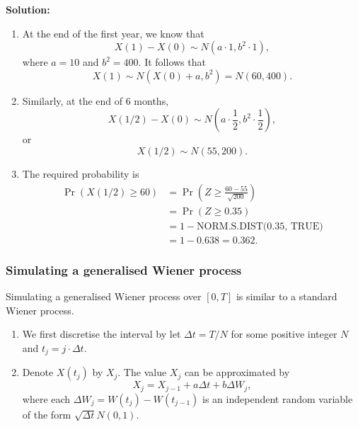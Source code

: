 \documentclass[
]{book}
\theoremstyle{definition}
\theoremstyle{definition}
\theoremstyle{definition}
\theoremstyle{definition}
\theoremstyle{remark}
\begin{document}
\textbf{Solution:}

\begin{enumerate}
\def\labelenumi{\arabic{enumi}.}
\item
  At the end of the first year, we know that
  \[X(1) - X(0) \sim N(a \cdot 1, b^2 \cdot 1),\] where \(a = 10\) and
  \(b^2 = 400\). It follows that
  \[X(1) \sim N(X(0) + a , b^2 ) = N(60, 400).\]
\item
  Similarly, at the end of 6 months,
  \[X(1/2) - X(0) \sim N(a \cdot \frac{1}{2}, b^2 \cdot \frac{1}{2}),\]
  or \[X(1/2) \sim N(55,200).\]
\item
  The required probability is \[\begin{aligned}
          \Pr( X(1/2) \ge 60) &= \Pr( Z \ge \frac{60 - 55}{\sqrt{200}}  )\\
          &= \Pr(Z \ge 0.35) \\
          &= 1 - \text{NORM.S.DIST(0.35, TRUE)} \\
          &= 1 - 0.638 = 0.362.
      \end{aligned}\]
\end{enumerate}

\hypertarget{simulating-a-generalised-wiener-process}{%
\subsubsection{Simulating a generalised Wiener process}\label{simulating-a-generalised-wiener-process}}

Simulating a generalised Wiener process over \([0,T]\) is similar to a
standard Wiener process.

\begin{enumerate}
\def\labelenumi{\arabic{enumi}.}
\item
  We first discretise the interval by let \(\Delta t = T/N\) for some
  positive integer \(N\) and \(t_j = j \cdot \Delta t\).
\item
  Denote \(X(t_j)\) by \(X_j\). The value \(X_j\) can be approximated by
  \[X_j = X_{j-1} + a \Delta t + b \Delta W_j,\] where each
  \(\Delta W_j = W(t_j) - W(t_{j-1})\) is an independent random variable
  of the form \(\sqrt{\Delta t} N(0,1)\).
\end{enumerate}
\end{document}
